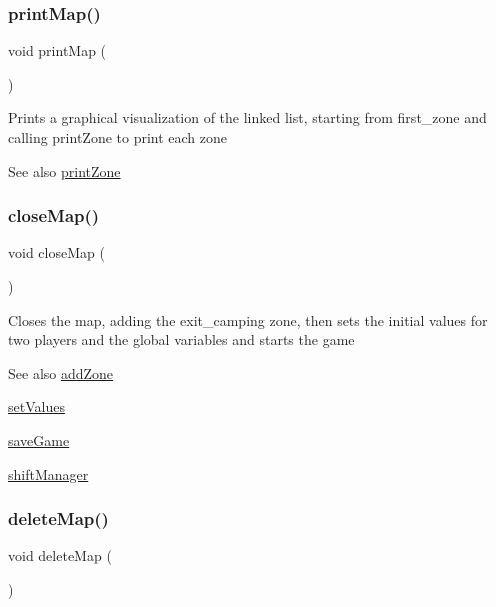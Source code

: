 \subsubsection{\texorpdfstring{print\+Map()}{printMap()}}
{\footnotesize\ttfamily void print\+Map (\begin{DoxyParamCaption}{ }\end{DoxyParamCaption})\hspace{0.3cm}{\ttfamily [static]}}

Prints a graphical visualization of the linked list, starting from first\+\_\+zone and calling print\+Zone to print each zone \begin{DoxySeeAlso}{See also}
\hyperlink{group__map_ga821f387806e6d9f8581df4d9823bb3e3}{print\+Zone} 
\end{DoxySeeAlso}
\mbox{\label{group__map_ga9c640fbe71cfc185d2031bfd50c3c697}} 
\subsubsection{\texorpdfstring{close\+Map()}{closeMap()}}
{\footnotesize\ttfamily void close\+Map (\begin{DoxyParamCaption}{ }\end{DoxyParamCaption})\hspace{0.3cm}{\ttfamily [static]}}

Closes the map, adding the exit\+\_\+camping zone, then sets the initial values for two players and the global variables and starts the game \begin{DoxySeeAlso}{See also}
\hyperlink{group__map_ga62518152079402c1d5dd4d7cb135ebb6}{add\+Zone} 

\hyperlink{group__system_ga1ad5b76589358eed58f97d25e63591ce}{set\+Values} 

\hyperlink{group__system_gac42f6d85eb40dfdfadbf9933d885b4c1}{save\+Game} 

\hyperlink{group__game_ga96997515bdc703f69dbb3df24d8342a7}{shift\+Manager} 
\end{DoxySeeAlso}
\mbox{\label{group__map_gad2a3b491f7cad674d88b575680059ad5}} 
\subsubsection{\texorpdfstring{delete\+Map()}{deleteMap()}}
{\footnotesize\ttfamily void delete\+Map (\begin{DoxyParamCaption}{ }\end{DoxyParamCaption})\hspace{0.3cm}{\ttfamily [static]}}

